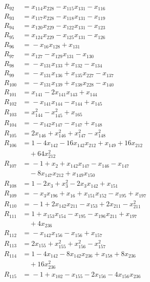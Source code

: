 \begin{align*}
R_{92} &={} x_{114}x_{228} -x_{115}x_{131} -x_{116} \\
R_{93} &={} x_{117}x_{228} -x_{118}x_{131} -x_{119} \\
R_{94} &={} x_{120}x_{229} -x_{122}x_{131} -x_{123} \\
R_{95} &={} x_{124}x_{229} -x_{125}x_{131} -x_{126} \\
R_{96} &={} -x_{16}x_{128} +x_{131} \\
R_{97} &={} x_{127} -x_{129}x_{131} -x_{130} \\
R_{98} &={} -x_{131}x_{133} +x_{132} -x_{134} \\
R_{99} &={} -x_{131}x_{136} +x_{135}x_{227} -x_{137} \\
R_{100} &={} -x_{131}x_{139} +x_{138}x_{228} -x_{140} \\
R_{101} &={} x_{141} -2x_{141}x_{143} +x_{144} \\
R_{102} &={} -x_{141}x_{144} -x_{144} +x_{145} \\
R_{103} &={} x_{144}^{2} -x_{145}^{2} +x_{165} \\
R_{104} &={} -x_{142}x_{147} -x_{147} +x_{148} \\
R_{105} &={} 2x_{146} +x_{146}^{2} +x_{147}^{2} -x_{148}^{2} \\
R_{106} &={} 1 -4x_{142} -16x_{142}x_{212} +x_{149} +16x_{212} \\
&\quad{} +64x_{212}^{2} \\
R_{107} &={} -1 +x_{2} +x_{142}x_{147} -x_{146} -x_{147} \\
&\quad{} -8x_{147}x_{212} +x_{149}x_{150} \\
R_{108} &={} 1 -2x_{3} +x_{3}^{2} -2x_{3}x_{142} +x_{151} \\
R_{109} &={} -x_{3}x_{196} +x_{16} +x_{151}x_{152} -x_{195} +x_{197} \\
R_{110} &={} -1 +2x_{142}x_{211} -x_{153} +2x_{211} -x_{211}^{2} \\
R_{111} &={} 1 +x_{153}x_{154} -x_{195} -x_{196}x_{211} +x_{197} \\
&\quad{} +4x_{236} \\
R_{112} &={} -x_{142}x_{156} -x_{156} +x_{157} \\
R_{113} &={} 2x_{155} +x_{155}^{2} +x_{156}^{2} -x_{157}^{2} \\
R_{114} &={} 1 -4x_{142} -8x_{142}x_{236} +x_{158} +8x_{236} \\
&\quad{} +16x_{236}^{2} \\
R_{115} &={} -1 +x_{102} -x_{155} -2x_{156} -4x_{156}x_{236} \\

\end{align*}
